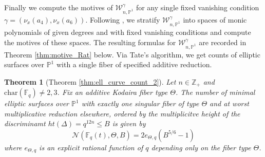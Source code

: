 \documentclass[a4paper,12pt]{amsart}
\newtheorem{thm}{Theorem}[section]
\theoremstyle{definition}
\newcommand{\bP}{\mathbb{P}}
\newcommand{\cW}{\mathcal{W}}
\newcommand{\Nc}{\mathcal{N}}
\newcommand{\Fb}{\mathbb{F}}
\begin{document}
	Finally we compute the motives of $\cW^{\gamma}_{n, \bP^1}$ for any single fixed vanishing condition $\gamma = (\nu_x(a_4), \nu_x(a_6))$. Following \cite{FW, HP}, we stratify $\cW^{\gamma}_{n, \bP^1}$ into spaces of monic polynomials of given degrees and with fixed vanishing conditions and compute the motives of these spaces. The resulting formulas for $\cW^{\gamma}_{n, \bP^1}$ are recorded in Theorem \ref{thm:motive_Rat} below. Via Tate's algorithm, we get counts of elliptic surfaces over $\bP^1$ with a single fiber of specified additive reduction. 
	
	\begin{thm}[Theorem \ref{thm:ell_curve_count_2}]\label{thm:count_kodaira_intro} Let $n \in \mathbb{Z}_{+}$ and $\mathrm{char}(\Fb_q) \neq 2,3$. Fix an additive Kodaira fiber type $\Theta$. The number of minimal elliptic surfaces over $\bP^1$ with exactly one singular fiber of type $\Theta$ and at worst multiplicative reduction elsewhere, ordered by the multiplicitve height of the discriminamt $ht(\Delta) = q^{12n} \le B$ is given by 
		$$
		\Nc(\Fb_q(t), \Theta, B) = 2 e_{\Theta,q} (B^{5/6} - 1)
		$$
		where $e_{\Theta,q}$ is an explicit rational function of $q$ depending only on the fiber type $\Theta$. 
	\end{thm} 
	
	
	
	
	
	
	\newpage
	
\end{document}
